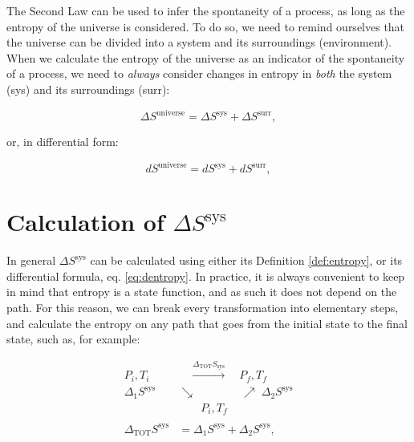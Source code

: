 \documentclass[
]{book}
\theoremstyle{definition}
\theoremstyle{definition}
\theoremstyle{definition}
\theoremstyle{remark}
\begin{document}
The Second Law can be used to infer the spontaneity of a process, as long as the entropy of the universe is considered. To do so, we need to remind ourselves that the universe can be divided into a system and its surroundings (environment). When we calculate the entropy of the universe as an indicator of the spontaneity of a process, we need to \emph{always} consider changes in entropy in \emph{both} the system (sys) and its surroundings (surr):

\begin{equation}
\Delta S^{\mathrm{universe}} = \Delta S^{\mathrm{sys}} + \Delta S^{\mathrm{surr}},
\label{eq:dsuniv}
\end{equation}

or, in differential form:

\begin{equation}
d S^{\mathrm{universe}} = d S^{\mathrm{sys}} + d S^{\mathrm{surr}},
\label{eq:dsunivd}
\end{equation}

\hypertarget{dssys}{%
\section{\texorpdfstring{Calculation of \(\Delta S^{\mathrm{sys}}\)}{Calculation of \textbackslash Delta S\^{}\{\textbackslash mathrm\{sys\}\}}}\label{dssys}}

In general \(\Delta S^{\mathrm{sys}}\) can be calculated using either its Definition \ref{def:entropy}, or its differential formula, eq. \eqref{eq:dentropy}. In practice, it is always convenient to keep in mind that entropy is a state function, and as such it does not depend on the path. For this reason, we can break every transformation into elementary steps, and calculate the entropy on any path that goes from the initial state to the final state, such as, for example:

\begin{equation}
\begin{aligned}
P_i, T_i & \quad \xrightarrow{ \Delta_{\text{TOT}} S_{\text{sys}} } \quad P_f, T_f \\
  \scriptstyle{\Delta_1 S^{\text{sys}}} & \searrow \qquad  \qquad \nearrow \; \scriptstyle{\Delta_2 S^{\text{sys}}} \\
& \qquad P_i, T_f \\
\\
\Delta_{\text{TOT}} S^{\text{sys}} & = \Delta_1 S^{\text{sys}} + \Delta_2 S^{\text{sys}},
\end{aligned}
\label{eq:entropycycle}
\end{equation}
\end{document}
